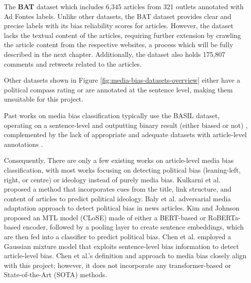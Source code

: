 The \textbf{BAT} dataset \cite{spinde-2023-bat} which includes 6,345 articles from 321 outlets annotated with Ad Fontes labels. Unlike other datasets, the BAT dataset provides clear and precise labels with its bias reliability scores for articles. However, the dataset lacks the textual content of the articles, requiring further extension by crawling the article content from the respective websites, a process which will be fully described in the next chapter. Additionally, the dataset also holds 175,807 comments and retweets related to the articles.

Other datasets shown in Figure \ref{fig:media-bias-datasets-overview} either have a political compass rating or are annotated at the sentence level, making them unsuitable for this project.

Past works on media bias classification typically use the BASIL dataset, operating on a sentence-level and outputting binary result (either biased or not) \cite{maab-2023-lexical-bias-detection, maab-2023-target-aware, guo-2022-modeling, van-den-berg-2020-context,lee-2021-unifying,lei-2022-sentence,lei-2024-event-relation,krieger-2022-domain}, complemented by the lack of appropriate and adequate datasets with article-level annotations \cite{demidov-2023-political-bias-classification}.

Consequently, There are only a few existing works on article-level media bias classification, with most works focusing on detecting political bias (leaning-left, right, or centre) or ideology instead of purely media bias. Kulkarni et al. \cite{kulkarni-2018-multi-view} proposed a method that incorporates cues from the title, link structure, and content of articles to predict political ideology. Baly et al. \cite{baly-2020-we-can-detect-your-bias} adversarial media adaptation approach to detect political bias in news articles. Kim and Johnson \cite{kim-johnson-2022-close} proposed an MTL model (CLoSE) made of either a BERT-based or RoBERTa-based encoder, followed by a pooling layer to create sentence embeddings, which are then fed into a classifier to predict political bias. Chen et al. \cite{chen-2020-detecting-media-bias-gaussian} employed a Gaussian mixture model that exploits sentence-level bias information to detect article-level bias. Chen et al.'s definition and approach to media bias closely align with this project; however, it does not incorporate any transformer-based or State-of-the-Art (SOTA) methods.


